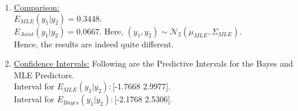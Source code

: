 \documentclass{article}
\begin{document}
\begin{enumerate}
\item \underline{Comparison:}\\
$E_{MLE}(y_1|y_2) = 0.3448.$\\
$E_{Joint}(y_1|y_2) = 0.0667.$ Here, $(y_1,y_2) \sim \mathcal{N}_2(\mu_{MLE},\Sigma_{MLE}).$\\

Hence, the results are indeed quite different. \\

\item \underline{Confidence Intervals:}
Following are the  Predictive Intervals for the Bayes and MLE Predictors.\\
Interval for $E_{MLE}(y_1|y_2):$[-1.7668 2.9977].\\
Interval for $E_{Bayes}(y_1|y_2):$[-2.1768 2.5306].\\
\end{enumerate}

\pagebreak
{}\\

\end{document}
